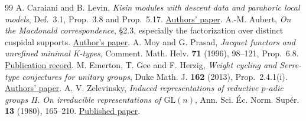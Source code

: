 \documentclass[a4paper,11pt]{article}
\theoremstyle{definition}
\theoremstyle{remark}
\numberwithin{equation}{section}
\begin{document}
\begin{thebibliography}{99}
 A. Caraiani and B. Levin, \emph{Kisin modules with descent data and parahoric local models}, Def.~3.1, Prop.~3.8 and Prop.~5.17. \href{https://arxiv.org/abs/1510.07503}{Authors' paper}.
 A.-M. Aubert, \emph{On the Macdonald correspondence}, \S2.3, especially the factorization over distinct cuspidal supports. \href{https://arxiv.org/abs/2501.02332}{Author's paper}.
 A. Moy and G. Prasad, \emph{Jacquet functors and unrefined minimal K-types}, Comment. Math. Helv. \textbf{71} (1996), 98--121, Prop.~6.8. \href{https://researchportal.hkust.edu.hk/en/publications/jacquet-functors-and-unrefined-minimal-k-types/}{Publication record}.
 M. Emerton, T. Gee and F. Herzig, \emph{Weight cycling and Serre-type conjectures for unitary groups}, Duke Math. J. \textbf{162} (2013), Prop.~2.4.1(i). \href{https://www.math.uchicago.edu/~emerton/pdffiles/egh.pdf}{Authors' paper}.
 A. V. Zelevinsky, \emph{Induced representations of reductive $p$-adic groups II. On irreducible representations of $\mathrm{GL}(n)$}, Ann. Sci. \'Ec. Norm. Sup\'er. \textbf{13} (1980), 165--210. \href{https://www.numdam.org/item/ASENS_1980_4_13_2_165_0/}{Published paper}.
\end{thebibliography}\endgroup
\end{document}
